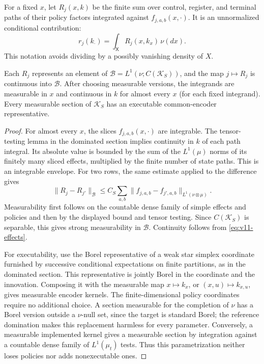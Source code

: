 For a fixed $x$, let $R_j(x,k)$ be the finite sum over control, register,
and terminal paths of their policy factors integrated against
$f_{j,a,b}(x,\cdot)$. It is an unnormalized conditional contribution:
\[
 r_j(k_\cdot)=\int_{\mathsf X}R_j(x,k_x)\,\nu(dx).
\]
This notation avoids dividing by a possibly vanishing density of $X$.

\begin{lemma}
\label{lem:v11-integrands}
Each $R_j$ represents an element of
$\mathcal B=L^1(\nu;C(\mathcal K_S))$, and the map $j\mapsto R_j$ is
continuous into $\mathcal B$. After choosing measurable versions, the
integrands are measurable in $x$ and continuous in $k$ for almost every
$x$ (for each fixed integrand). Every measurable section of
$\mathcal K_S$ has an executable common-encoder representative.
\end{lemma}

\begin{proof}
For almost every $x$, the slices $f_{j,a,b}(x,\cdot)$ are integrable.
The tensor-testing lemma in the dominated section implies continuity in
$k$ of each path integral. Its absolute value is bounded by the sum of
the $L^1(\mu)$ norms of its finitely many sliced effects, multiplied by
the finite number of state paths. This is an integrable envelope.
For two rows, the same estimate applied to the difference gives
\[
 \|R_j-R_{j'}\|_{\mathcal B}
 \le C_S\sum_{a,b}\|f_{j,a,b}-f_{j',a,b}\|_{L^1(\nu\otimes\mu)}.
\]
Measurability first follows on the countable dense family of simple
effects and policies and then by the displayed bound and tensor testing.
Since $C(\mathcal K_S)$ is separable, this gives strong measurability in
$\mathcal B$. Continuity follows from \eqref{eq:v11-effects}.

For executability, use the Borel representative of a weak star simplex
coordinate furnished by successive conditional expectations on finite
partitions, as in the dominated section. This representative is jointly
Borel in the coordinate and the innovation. Composing it with the
measurable map $x\mapsto k_x$, or $(x,u)\mapsto k_{x,u}$, gives measurable
encoder kernels. The finite-dimensional policy coordinates require no
additional choice. A section measurable for the completion of $\nu$ has
a Borel version outside a $\nu$-null set, since the target is standard
Borel; the reference domination makes this replacement harmless for
every parameter. Conversely, a measurable implemented kernel gives a
measurable section by integration against a countable dense family of
$L^1(\mu_t)$ tests. Thus this parametrization neither loses policies nor
adds nonexecutable ones.
\end{proof}

